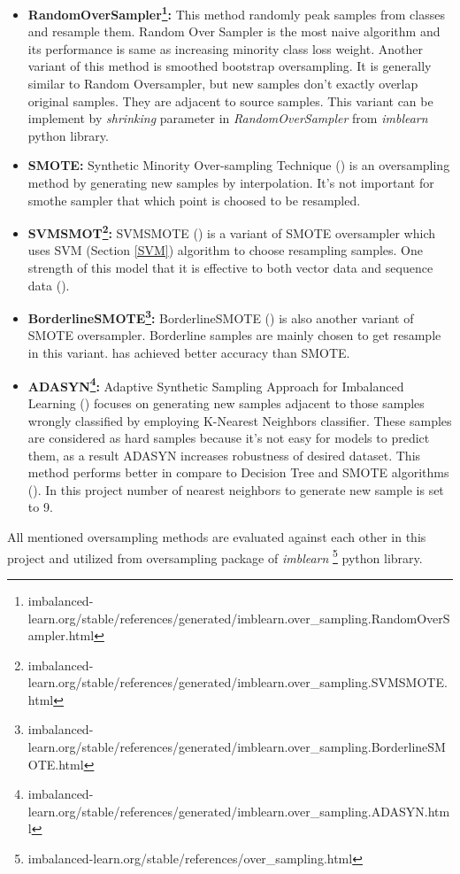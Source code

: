 \begin{itemize}
	\item \textbf{RandomOverSampler\footnote{imbalanced-learn.org/stable/references/generated/imblearn.over\_sampling.RandomOverSampler.html}:} This method randomly peak samples from classes and resample them. Random Over Sampler is the most naive algorithm and its performance is same as increasing minority class loss weight. Another variant of this method is smoothed bootstrap oversampling. It is generally similar to Random Oversampler, but new samples don't exactly overlap original samples. They are adjacent to source samples. This variant can be implement by \textit{shrinking} parameter in \textit{RandomOverSampler} from \textit{imblearn} python library. 
	
	\item \textbf{SMOTE:} 
	Synthetic Minority Over-sampling Technique (\cite{smothe}) is an oversampling method by generating new samples by interpolation. It's not important for smothe sampler that which point is choosed to be resampled. 
	
	\item \textbf{SVMSMOT\footnote{imbalanced-learn.org/stable/references/generated/imblearn.over\_sampling.SVMSMOTE.html}:} 
	SVMSMOTE (\cite{svmsmothe}) is a variant of SMOTE oversampler which uses SVM (Section \ref{SVM}) algorithm to choose resampling samples. One strength of this model that it is effective to both vector data and sequence data (\cite{svmsmothe}).
	
	\item \textbf{BorderlineSMOTE\footnote{imbalanced-learn.org/stable/references/generated/imblearn.over\_sampling.BorderlineSMOTE.html}:} 
	BorderlineSMOTE (\cite{borderlinesmothe}) is also another variant of SMOTE oversampler. Borderline samples are mainly chosen to get resample in this variant. \cite{borderlinesmothe} has achieved better accuracy than SMOTE.
	\item \textbf{ADASYN\footnote{imbalanced-learn.org/stable/references/generated/imblearn.over\_sampling.ADASYN.html}:} 
	Adaptive Synthetic Sampling Approach for Imbalanced Learning (\cite{adasyn}) focuses on generating new samples adjacent to those samples wrongly classified by employing K-Nearest Neighbors classifier. These samples are considered as hard samples because it's not easy for models to predict them, as a result ADASYN increases robustness of desired dataset. This method performs better in compare to Decision Tree and SMOTE algorithms (\cite{adasyn}). In this project number of nearest neighbors to generate new sample is set to 9.
	
\end{itemize}
All mentioned oversampling methods are evaluated against each other in this project and utilized from oversampling package of \textit{imblearn} \footnote{imbalanced-learn.org/stable/references/over\_sampling.html} python library. 

